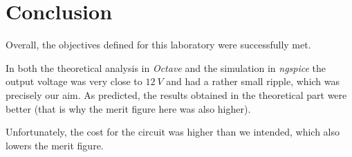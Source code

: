 
\section{Conclusion}
\label{sec:conclusion}

Overall, the objectives defined for this laboratory were successfully met.

In both the theoretical analysis in \textit{Octave} and the simulation in \textit{ngspice} the output voltage was very close to $12 \ V$ and had a rather small ripple, which was precisely our aim. As predicted, the results obtained in the theoretical part were better (that is why the merit figure here was also higher).

Unfortunately, the cost for the circuit was higher than we intended, which also lowers the merit figure.
